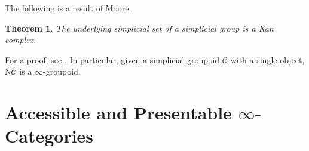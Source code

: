 \documentclass[a4paper]{book}
\newcommand{\lC}{\mathcal{C}}
\newcommand{\mN}{\mathrm{N}}
\newtheorem{theorem}[equation]{Theorem}
\theoremstyle{definition}
\theoremstyle{remark}
\numberwithin{equation}{section}
\begin{document}
The following is a result of Moore. 
\begin{theorem}
	The underlying simplicial set of a simplicial group is a Kan complex. 
\end{theorem}For a proof, see \cite[Ch. 1, Lemma 3.4]{goerssjardine1999simplicialhomotopytheory}. In particular, given a simplicial groupoid $\lC$ with a single object, $\mN\lC$ is a $\infty$-groupoid.




\section{Accessible and Presentable \texorpdfstring{$\infty$}{oo}-Categories}

\end{document}
